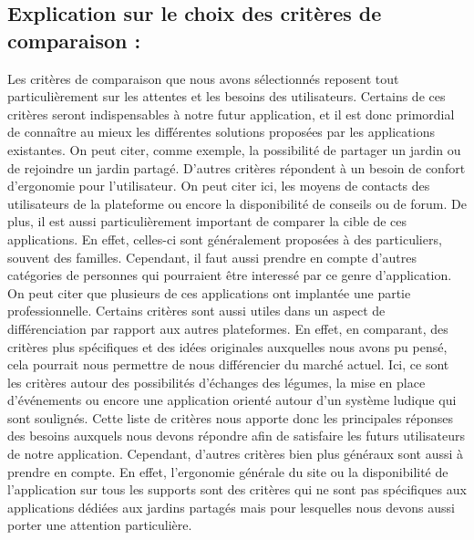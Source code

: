 \documentclass{article}
\begin{document}
\subsection*{Explication sur le choix des critères de comparaison :}
Les critères de comparaison que nous avons sélectionnés reposent tout particulièrement sur les attentes et les besoins des utilisateurs. Certains de ces critères seront indispensables à notre futur application, et il est donc primordial de connaître au mieux les différentes solutions proposées par les applications existantes. On peut citer, comme exemple, la possibilité de partager un jardin ou de rejoindre un jardin partagé. 
\newline
D’autres critères répondent à un besoin de confort d'ergonomie pour l’utilisateur. On peut citer ici, les moyens de contacts des utilisateurs de la plateforme ou encore la disponibilité de conseils ou de forum. De plus, il est aussi particulièrement important de comparer la cible de ces applications. En effet, celles-ci sont généralement proposées à des particuliers, souvent des familles. Cependant, il faut aussi prendre en compte d'autres catégories de personnes qui pourraient être interessé par ce genre d'application. On peut citer que plusieurs de ces applications ont implantée une partie professionnelle. 
\newline
Certains critères sont aussi utiles dans un aspect de différenciation par rapport aux autres plateformes. En effet, en comparant, des critères plus spécifiques et des idées originales auxquelles nous avons pu pensé, cela pourrait nous permettre de nous différencier du marché actuel. Ici, ce sont les critères autour des possibilités d’échanges des légumes, la mise en place d'événements ou encore une application orienté autour d'un système ludique qui sont soulignés. 
\newline
Cette liste de critères nous apporte donc les principales réponses des besoins auxquels nous devons répondre afin de satisfaire les futurs utilisateurs de notre application. Cependant, d’autres critères bien plus généraux sont aussi à prendre en compte. En effet, l’ergonomie générale du site ou la disponibilité de l’application sur tous les supports sont des critères qui ne sont pas spécifiques aux applications dédiées aux jardins partagés mais pour lesquelles nous devons aussi porter une attention particulière. 
\end{document}

